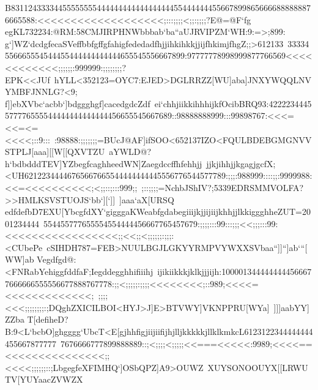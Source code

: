 {{{ B83112433334455555555444444444444444444554444444556678998656666888888876665588:<<<<<<<<<<<<<<<<<<<;:::;;;;<;;:;;;;?E@=@F`fg%
 egKL732234:@RM:58CMJIRPHNWbbbab`ba``aUJRVIPZM`WH:9:=>;899:}
 \hbox{g`]WZ`dcdgfecaSVeffbbfgffgfahigfededadfhjjihkihkkjjijfhkimjfhgZ;;>612133%
 33334556665554544455444444444444655545556667899:97777778998999877766569<<<<<<<<<<<<;;;;;;:999999:;;;;;;;;?EPK<<JUf%
 hYLL<352123=OYC7:EJED>DGLRRZZ[WU]aba]JNXYWQQLNVYMBFJNNLG?<9;}
 \hbox{f]]ebXVbc`acbb`]bdggghgf]cacedgdcZdf%
 ei`chhjiikkihhhijkfOcibBRQ93:4222234445577776555544444444444444456655545667689::98888888999:::99898767:<<<=<<=<=<<<<;::9:::%
 :98888:;;;;;;;=BUcJ@AF]ifSOO<652137IZO<FQULBDEBGMGNVVSTPLJ[aaa][[W[[QXVTZU%
 aYWLD@?}
 \hbox{h`bdbdddTEV]YZbegfcaghheedWN]Zaegdccffhfehhjj%
 jjkjihhjjkgagjgcfX;<UH62122344446765667665544444444445556776544577789:;;;:988999::::;;:9999988:<<=<<<<<<<<<<;<;;::;:::999;;%
 ;::;;;;=NchbJShIV?;5339EDRSMMVOLFA?>>HMLKSVSTUOJS`bb`][`]]%
 ]aaa`aX[URSQ}
 \hbox{edfdefbD7EXU[YbcgfdXY`gigggaKWeabfgdabegiiijkjjijiijkhhjjlkkiggghheZUT=2001234444%
 554455777655554554444456667765457679:;;;;:::99:::;;;<<;;;:::99:<<<<<<<<<<<<<<<<<;;<<;;<;;;;;;:;;;:<CUbePe%
 cSIHDH787=FEB>NUULBGJLGKYYRMPVYWXXSVbaa``]]``]ab```[WW]ab}
 \hbox{Vegdfgd@:<FNRabYehiggfddfaF;Iegddegghhifiiihj%
 ijikiikkkjklkjjjijh:1000013444444444566677666666555556677888767778:;;<;;;;;:;;;;<<<<<<<<;::989;<<<<=<<<<<<<<<<<<<;%
 ;;;;<<<;;;;;;;;:;DQghZXICILBOI<HYJ>J]E>BTVWY]VKNPPRU[WYa]%
 ]]]aabYY]ZZba}
 \hbox{T[defiheD?B:9<L`bcbO]ghgggg`UbcT<E[gjhhfigjiijiifijhjlljkkkkkjllklkmkcL6123122344444444455667877777%
 7676666777899888889::;<;;;;<;;;;;<<===<<<<<:9989;<<<<==<<<<<<<<<<<<<<<;;<<<<;;;;;;::;LbgegfeXFIMHQ`]OSbQPZ]A9>OUWZ%
 XUYSONOOUYX[[LRWUTV[YUYaacZVWZX}
}}
